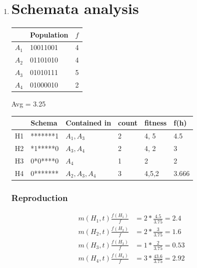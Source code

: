 \documentclass{article}
\begin{document}
\begin{enumerate}
\begin{itemize}
    \end{itemize}
    \item \section*{Schemata analysis}
        \begin{table}[h]
            \centering
            \begin{tabular}{l|l|l}
                & Population & $f$ \\
                \hline
                $A_1$ & 10011001  & 4 \\
                $A_2$ & 01101010  & 4 \\
                $A_3$ & 01010111  & 5 \\
                $A_4$ & 01000010  & 2
            \end{tabular}
        \end{table}
        Avg = 3.25
        \begin{table}[h]
            \centering
            \begin{tabular}{l|l|l|l|l|l}
                & Schema & Contained in &count & fitness & f(h) \\
                \hline
                H1& *******1 & $A_1, A_3$ & 2 & 4, 5 & 4.5\\
                H2& *1*****0 & $A_3, A_4$ & 2 & 4, 2 & 3\\
                H3& 0*0****0 & $A_4$ & 1 & 2 & 2\\
                H4& 0******* & $A_2, A_3, A_4$ &3 & 4,5,2 & 3.666\\
            \end{tabular}
        \end{table}

        \subsubsection*{Reproduction}
        \begin{align*}
            m(H_1,t) \frac{f(H_1)}{f}&= 2 *\frac{4.5}{3.75} = 2.4\\
            m(H_2,t) \frac{f(H_2)}{f}&= 2 *\frac{3}{3.75} = 1.6\\
            m(H_3,t) \frac{f(H_3)}{f}&= 1 *\frac{2}{3.75} = 0.53\\
            m(H_4,t) \frac{f(H_4)}{f}&= 3 *\frac{43.6}{3.75} = 2.92\\
        \end{align*}


\end{enumerate}
\end{document}
